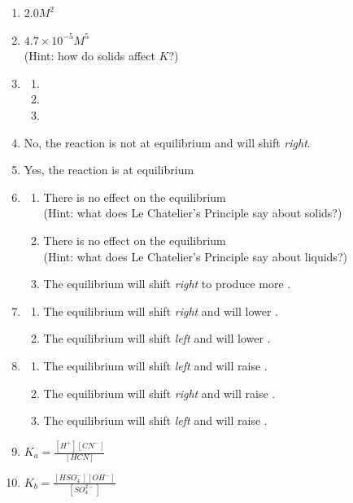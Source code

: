 \documentclass[11pt, oneside]{article}   	%
\begin{document}
\begin{enumerate}
\item $2.0 M^{2}$ 
\item $4.7 \times 10^{-5} M^{5}$\\ (Hint: how do solids affect $K$?)

\item 
\begin{enumerate}
\item {}
\item {}
\item {}
\end{enumerate}

\item No, the reaction is not at equilibrium and will shift \emph{right}.
\item Yes, the reaction is at equilibrium

\item 
\begin{enumerate}
\item There is no effect on the equilibrium\\ (Hint: what does Le Chatelier's Principle say about solids?)
\item There is no effect on the equilibrium\\ (Hint: what does Le Chatelier's Principle say about liquids?)
\item The equilibrium will shift \emph{right} to produce more .
\end{enumerate}

\item 
\begin{enumerate}
\item The equilibrium will shift \emph{right} and will lower \ce{[H2]}.
\item The equilibrium will shift \emph{left} and will lower \ce{[HF]}.
\end{enumerate}

\item 
\begin{enumerate}
\item The equilibrium will shift \emph{left} and will raise \ce{[H2]}.
\item The equilibrium will shift \emph{right} and will raise \ce{[NH3]}.
\item The equilibrium will shift \emph{left} and will raise \ce{[N2]}.
\end{enumerate}

\item $K_{a} = \frac{ [ H^{+} ] [CN^{-}] }{ [HCN]  }$
\item $K_{b} =  \frac{ [ HSO_{4}^{-} ]  [OH^{-}] } { [SO_{4}^{2-}] }$
\end{enumerate}
\end{document}

